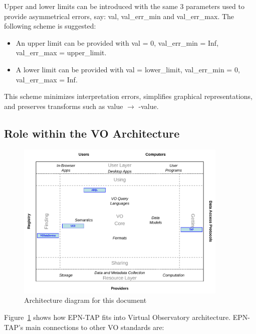 \documentclass[11pt,a4paper]{ivoa}
\begin{document}
\begin{itemize}
Upper and lower limits can be introduced with the same 3 parameters used to provide asymmetrical errors, say: val, val\_err\_min and val\_err\_max. The following scheme is suggested: 

\begin{itemize}
\item An upper limit can be provided with val = 0, val\_err\_min = Inf, val\_err\_max = upper\_limit.

\item A lower limit can be provided with val = lower\_limit, val\_err\_min = 0, val\_err\_max = Inf.
\end{itemize}

This scheme minimizes interpretation errors, simplifies graphical representations, and preserves transforms such as value $\to$ -value.


\end{itemize}



\subsection{Role within the VO Architecture}

\begin{figure}[thb]
\centering

\includegraphics[width=0.9\textwidth]{role_diagram.pdf}
\caption{Architecture diagram for this document}
\label{fig:archdiag}
\end{figure}


Figure~\ref{fig:archdiag} shows how EPN-TAP fits into Virtual
Observatory architecture.  EPN-TAP's main connections to other VO
standards are:
\end{document}
